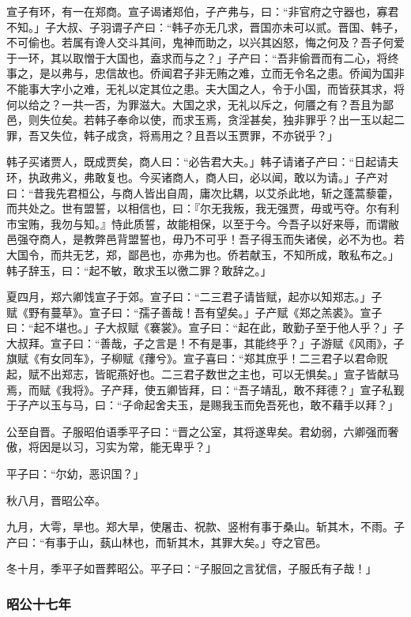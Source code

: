 \documentclass[]{article}
\begin{document}
宣子有环，有一在郑商。宣子谒诸郑伯，子产弗与，曰：``非官府之守器也，寡君不知。」子大叔、子羽谓子产曰：``韩子亦无几求，晋国亦未可以贰。晋国、韩子，不可偷也。若属有谗人交斗其间，鬼神而助之，以兴其凶怒，悔之何及？吾子何爱于一环，其以取憎于大国也，盍求而与之？」子产曰：``吾非偷晋而有二心，将终事之，是以弗与，忠信故也。侨闻君子非无贿之难，立而无令名之患。侨闻为国非不能事大字小之难，无礼以定其位之患。夫大国之人，令于小国，而皆获其求，将何以给之？一共一否，为罪滋大。大国之求，无礼以斥之，何餍之有？吾且为鄙邑，则失位矣。若韩子奉命以使，而求玉焉，贪淫甚矣，独非罪乎？出一玉以起二罪，吾又失位，韩子成贪，将焉用之？且吾以玉贾罪，不亦锐乎？」

韩子买诸贾人，既成贾矣，商人曰：``必告君大夫。」韩子请诸子产曰：``日起请夫环，执政弗义，弗敢复也。今买诸商人，商人曰，必以闻，敢以为请。」子产对曰：``昔我先君桓公，与商人皆出自周，庸次比耦，以艾杀此地，斩之蓬蒿藜藿，而共处之。世有盟誓，以相信也，曰：『尔无我叛，我无强贾，毋或丐夺。尔有利市宝贿，我勿与知。』恃此质誓，故能相保，以至于今。今吾子以好来辱，而谓敝邑强夺商人，是教弊邑背盟誓也，毋乃不可乎！吾子得玉而失诸侯，必不为也。若大国令，而共无艺，郑，鄙邑也，亦弗为也。侨若献玉，不知所成，敢私布之。」韩子辞玉，曰：``起不敏，敢求玉以徼二罪？敢辞之。」

夏四月，郑六卿饯宣子于郊。宣子曰：``二三君子请皆赋，起亦以知郑志。」子\\
赋《野有蔓草》。宣子曰：``孺子善哉！吾有望矣。」子产赋《郑之羔裘》。宣子曰：``起不堪也。」子大叔赋《褰裳》。宣子曰：``起在此，敢勤子至于他人乎？」子大叔拜。宣子曰：``善哉，子之言是！不有是事，其能终乎？」子游赋《风雨》，子旗赋《有女同车》，子柳赋《蘀兮》。宣子喜曰：``郑其庶乎！二三君子以君命贶起，赋不出郑志，皆昵燕好也。二三君子数世之主也，可以无惧矣。」宣子皆献马焉，而赋《我将》。子产拜，使五卿皆拜，曰：``吾子靖乱，敢不拜德？」宣子私觐于子产以玉与马，曰：``子命起舍夫玉，是赐我玉而免吾死也，敢不藉手以拜？」

公至自晋。子服昭伯语季平子曰：``晋之公室，其将遂卑矣。君幼弱，六卿强而奢傲，将因是以习，习实为常，能无卑乎？」

平子曰：``尔幼，恶识国？」

秋八月，晋昭公卒。

九月，大雩，旱也。郑大旱，使屠击、祝款、竖柎有事于桑山。斩其木，不雨。子产曰：``有事于山，蓺山林也，而斩其木，其罪大矣。」夺之官邑。

冬十月，季平子如晋葬昭公。平子曰：``子服回之言犹信，子服氏有子哉！」

\hypertarget{header-n2649}{%
\subsubsection{昭公十七年}\label{header-n2649}}
\end{document}
